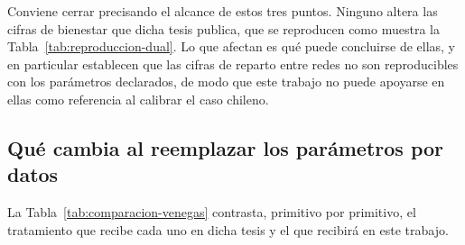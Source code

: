 Conviene cerrar precisando el alcance de estos tres puntos. Ninguno altera las
cifras de bienestar que dicha tesis publica, que se reproducen como muestra la
Tabla~\ref{tab:reproduccion-dual}. Lo que afectan es qué puede concluirse de
ellas, y en particular establecen que las cifras de reparto entre redes no son
reproducibles con los parámetros declarados, de modo que este trabajo no puede
apoyarse en ellas como referencia al calibrar el caso chileno.

\subsection{Qué cambia al reemplazar los parámetros por datos}
\label{c4:venegas-contraste}

La Tabla~\ref{tab:comparacion-venegas} contrasta, primitivo por primitivo, el
tratamiento que recibe cada uno en dicha tesis y el que recibirá en este
trabajo.

